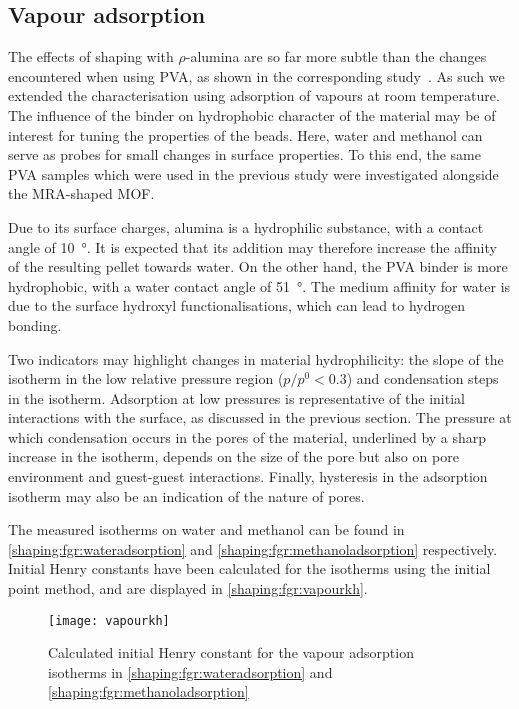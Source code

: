 
\subsection{Vapour adsorption}

The effects of shaping with \(\rho\)-alumina are 
so far more subtle than the changes encountered when using 
PVA, as shown in the corresponding 
study~\cite{chanutObservingEffectsShaping2016}.
As such we extended the characterisation using adsorption
of vapours at room temperature.
The influence of the binder on hydrophobic character of the
material may be of interest for tuning the properties of the 
beads. Here, water and methanol
can serve as probes for small changes in surface properties.
To this end, the same PVA samples which were 
used in the previous study were investigated alongside 
the MRA-shaped MOF.

Due to its surface charges, alumina is a 
hydrophilic substance, with a contact 
angle of \SI{10}{\degree}. It is expected that its 
addition may therefore increase the affinity 
of the resulting pellet towards water. On the other hand,
the PVA binder is more hydrophobic, with a water contact
angle of \SI{51}{\degree}. The medium affinity for water
is due to the surface hydroxyl functionalisations, which
can lead to hydrogen bonding.

Two indicators may highlight changes in material hydrophilicity: 
the slope of the isotherm in the low relative pressure region 
(\(p/p^0 < 0.3\)) and condensation steps in the isotherm. 
Adsorption at low pressures is representative of the initial
interactions with the surface, as discussed in the previous section.
The pressure at which condensation occurs in the pores of the material, 
underlined by a sharp increase in the isotherm, depends on the 
size of the pore but also on pore environment and 
guest-guest interactions. Finally, hysteresis in the adsorption 
isotherm may also be an indication of the nature of pores.

The measured isotherms on water and methanol can be found
in \autoref{shaping:fgr:wateradsorption} 
and \autoref{shaping:fgr:methanoladsorption} respectively.
Initial Henry constants have been calculated for the isotherms
using the initial point method, and are displayed in
\autoref{shaping:fgr:vapourkh}.

\begin{figure}[htb]
    \centering
    \texttt{[image: vapourkh]}%
    \caption{Calculated initial Henry constant for
    the vapour adsorption isotherms 
    in \autoref{shaping:fgr:wateradsorption}
    and \autoref{shaping:fgr:methanoladsorption}}%
    \label{shaping:fgr:vapourkh}
\end{figure}

